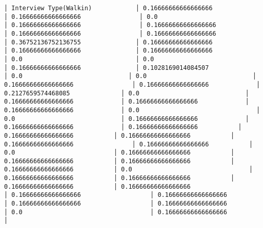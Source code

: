\documentclass[11pt]{article}
\begin{document}
\begin{Verbatim}[commandchars=\\\{\}]
│ Interview Type(Walkin)            │ 0.16666666666666666                │ 0.16666666666666666                │ 0.0                                │ 0.16666666666666666                │ 0.16666666666666666                │ 0.16666666666666666                │ 0.16666666666666666                │ 0.36752136752136755               │ 0.16666666666666666               │ 0.16666666666666666               │ 0.16666666666666666                │ 0.0                               │ 0.0                               │ 0.16666666666666666               │ 0.1028169014084507              │ 0.0                             │ 0.0                             │ 0.16666666666666666                │ 0.16666666666666666             │ 0.2127659574468085              │ 0.0                             │ 0.16666666666666666             │ 0.16666666666666666             │ 0.16666666666666666             │ 0.0                                │ 0.0                             │ 0.16666666666666666             │ 0.16666666666666666             │ 0.16666666666666666           │ 0.16666666666666666           │ 0.16666666666666666           │ 0.16666666666666666                │ 0.16666666666666666           │ 0.0                           │ 0.16666666666666666           │ 0.16666666666666666           │ 0.16666666666666666           │ 0.16666666666666666           │ 0.0                                │ 0.16666666666666666           │ 0.16666666666666666           │ 0.16666666666666666           │ 0.16666666666666666                   │ 0.16666666666666666                   │ 0.16666666666666666                   │ 0.16666666666666666                   │ 0.16666666666666666                   │ 0.0                                   │ 0.16666666666666666                   │

\end{Verbatim}
\end{document}
